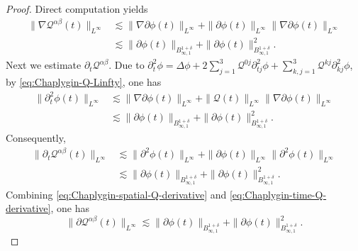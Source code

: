 \documentclass[11pt,twoside]{article}
\def\cQ{\mathcal Q}
\def\ds{\displaystyle}
\def\ls{\lesssim}
\theoremstyle{plain}
\theoremstyle{definition}
\theoremstyle{assumption}
\numberwithin{equation}{section}
\begin{document}
\begin{proof}
		Direct computation yields
		\begin{equation}\label{eq:Chaplygin-spatial-Q-derivative}
			\begin{aligned}
				\|\nabla\cQ^{\alpha\beta}(t)\|_{L^\infty}
				&\ls
				\|\nabla\partial\phi(t)\|_{L^\infty}
				+
				\|\partial\phi(t)\|_{L^\infty}
				\|\nabla\partial\phi(t)\|_{L^\infty}
				\\
				&\ls
				\|\partial\phi(t)\|_{B_{\infty,1}^{1+\delta}}
				+
				\|\partial\phi(t)\|_{B_{\infty,1}^{1+\delta}}^2.
			\end{aligned}
		\end{equation}
		Next we estimate $\partial_t\cQ^{\alpha\beta}$. Due to
		$\partial_t^2\phi
			=\Delta\phi	+2\ds\sum_{j=1}^3\cQ^{0j}\partial_{tj}^2\phi
			+\ds\sum_{k,j=1}^3\cQ^{kj}\partial_{kj}^2\phi$,
		by \eqref{eq:Chaplygin-Q-Linfty}, one has
		\begin{equation}\label{eq:Chaplygin-ttphi-Linfty}
			\begin{aligned}
				\|\partial_t^2\phi(t)\|_{L^\infty}
				&\ls
				\|\nabla\partial\phi(t)\|_{L^\infty}
				+
				\|\cQ(t)\|_{L^\infty}
				\|\nabla\partial\phi(t)\|_{L^\infty}
				\\
				&\ls
				\|\partial\phi(t)\|_{B_{\infty,1}^{1+\delta}}
				+
				\|\partial\phi(t)\|_{B_{\infty,1}^{1+\delta}}^2.
			\end{aligned}
		\end{equation}
		Consequently,
		\begin{equation}\label{eq:Chaplygin-time-Q-derivative}
			\begin{aligned}
				\|\partial_t\cQ^{\alpha\beta}(t)\|_{L^\infty}
				&\ls
				\|\partial^2\phi(t)\|_{L^\infty}
				+\|\partial\phi(t)\|_{L^\infty}
				\|\partial^2\phi(t)\|_{L^\infty}\\
				&\ls\|\partial\phi(t)\|_{B_{\infty,1}^{1+\delta}}
				+\|\partial\phi(t)\|_{B_{\infty,1}^{1+\delta}}^2.
			\end{aligned}
		\end{equation}
		Combining
		\eqref{eq:Chaplygin-spatial-Q-derivative} and
		\eqref{eq:Chaplygin-time-Q-derivative}, one has
		\begin{equation}\label{eq:Chaplygin-full-Q-derivative}
			\|\partial\cQ^{\alpha\beta}(t)\|_{L^\infty}
			\ls
			\|\partial\phi(t)\|_{B_{\infty,1}^{1+\delta}}
			+
			\|\partial\phi(t)\|_{B_{\infty,1}^{1+\delta}}^2.
		\end{equation}
		

\end{proof}
\end{document}
